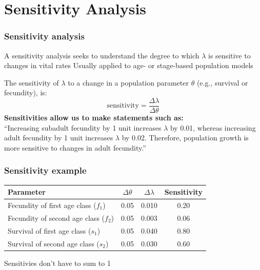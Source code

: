 \documentclass[color=usenames,dvipsnames]{beamer}\usepackage[]{graphicx}\usepackage[]{color}
\begin{document}
\section{Sensitivity Analysis}


\begin{frame}
  \frametitle{Sensitivity analysis}
  A sensitivity analysis seeks to understand the degree to which
  $\lambda$ is sensitive to changes in vital rates
  \pause
  \vfill
  Usually applied to age- or stage-based population models \par
  \pause
  \vfill
  The sensitivity of $\lambda$ to a change in a population parameter
  $\theta$ (e.g., survival or fecundity), is:
  \[
    \text{sensitivity} = \frac{\Delta \lambda}{\Delta \theta}
  \]
  \pause
  \vfill
  {\bf Sensitivities allow us to make statements such as:} \\
  ``Increasing subadult fecundity by 1 unit increases $\lambda$ by
  0.01, whereas increasing adult fecundity by 1 unit increases $\lambda$ by
  0.02. Therefore, population growth is more sensitive to changes in
  adult fecundity.''
\end{frame}



\begin{frame}
  \frametitle{Sensitivity example}
  \centering
  \small
  \begin{tabular}{lccc}
    \hline
    Parameter & $\Delta \theta$ & $\Delta \lambda$ & Sensitivity \\
    \hline
    Fecundity of first age class ($f_1$)  & 0.05 & 0.010 & 0.20 \\ %
    Fecundity of second age class ($f_2$) & 0.05 & 0.003 & 0.06 \\ %
    Survival of first age class ($s_1$)   & 0.05 & 0.040 & 0.80 \\ %
    Survival of second age class ($s_2$)   & 0.05 & 0.030 & 0.60 \\
    \hline
  \end{tabular}
  \vfill
  \normalsize
  \centering Sensitivies don't have to sum to 1 \par
\end{frame}
\end{document}
